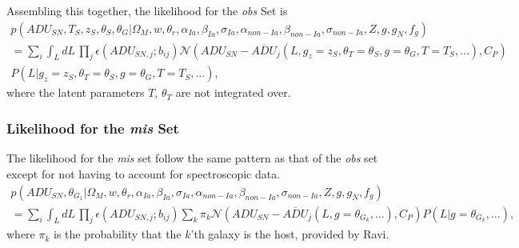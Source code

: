 \documentclass[preprint,3p]{elsarticle}
\begin{document}
Assembling this together, the likelihood for the {\it obs} Set is
\begin{multline}
p(\mathit{ADU}_{SN}, {{T}}_S,{{z}}_S, \theta_{S}, \theta_G |  \Omega_M, w, \theta_r, \alpha_{Ia}, \beta_{Ia},\sigma_{Ia}, \alpha_{\mathit{non-Ia}},\beta_{\mathit{non-Ia}}, \sigma_{\mathit{non-Ia}},  Z, g, g_N, f_g)\\
= \sum_i \int_L dL\, 
\prod_j
 \epsilon(\mathit{ADU}_{SN,j}; b_{ij}) 
\mathcal{N}\left(\mathit{ADU}_{SN} - \overline{\mathit{ADU}}_j(L ,
g_z=z_S, \theta_T=\theta_S, g=\theta_G, T=T_S, \ldots), C_P \right)\\
P(L|g_z=z_S, \theta_T=\theta_S, g=\theta_G, T=T_S, \ldots),
\end{multline} 
where the latent parameters $T$, $\theta_T$ are not integrated over.

\subsubsection{Likelihood for the {\it mis} Set}
The likelihood for the {\it mis} set follow the same pattern as that of the
{\it obs} set except for not having to account for spectroscopic data.
\begin{multline}
p(\mathit{ADU}_{SN}, \theta_{G_1} |  \Omega_M, w, \theta_r, \alpha_{Ia}, \beta_{Ia},\sigma_{Ia}, \alpha_{\mathit{non-Ia}},\beta_{\mathit{non-Ia}}, \sigma_{\mathit{non-Ia}},  Z, g, g_N, f_g) \\
 = \sum_i \int_L dL\, 
\prod_j
 \epsilon(\mathit{ADU}_{SN,j}; b_{ij}) \sum_k 
\pi_k\mathcal{N}\left(\mathit{ADU}_{SN} - \overline{\mathit{ADU}}_j(L ,
g=\theta_{G_k}, \ldots), C_P \right)
P(L|g=\theta_{G_k}, \ldots), 
\end{multline} 
where $\pi_k$ is the probability that the $k$'th galaxy is the host, provided by Ravi.

\end{document}
